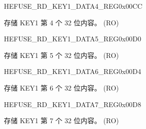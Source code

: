 \begin{register}{H}{EFUSE\_RD\_KEY1\_DATA4\_REG}{0x00CC}\label{regdesc:EFUSERDKEY1DATA4REG}
%
\regnewline%
\begin{regdesc}\begin{reglist}
\label{fielddesc:EFUSEKEY1DATA4}\item [EFUSE\_KEY1\_DATA4] 存储 KEY1 第 4 个 32 位内容。 (RO)
\end{reglist}\end{regdesc}
\end{register}


\begin{register}{H}{EFUSE\_RD\_KEY1\_DATA5\_REG}{0x00D0}\label{regdesc:EFUSERDKEY1DATA5REG}
%
\regnewline%
\begin{regdesc}\begin{reglist}
\label{fielddesc:EFUSEKEY1DATA5}\item [EFUSE\_KEY1\_DATA5] 存储 KEY1 第 5 个 32 位内容。 (RO)
\end{reglist}\end{regdesc}
\end{register}


\begin{register}{H}{EFUSE\_RD\_KEY1\_DATA6\_REG}{0x00D4}\label{regdesc:EFUSERDKEY1DATA6REG}
%
\regnewline%
\begin{regdesc}\begin{reglist}
\label{fielddesc:EFUSEKEY1DATA6}\item [EFUSE\_KEY1\_DATA6] 存储 KEY1 第 6 个 32 位内容。 (RO)
\end{reglist}\end{regdesc}
\end{register}


\begin{register}{H}{EFUSE\_RD\_KEY1\_DATA7\_REG}{0x00D8}\label{regdesc:EFUSERDKEY1DATA7REG}
%
\regnewline%
\begin{regdesc}\begin{reglist}
\label{fielddesc:EFUSEKEY1DATA7}\item [EFUSE\_KEY1\_DATA7] 存储 KEY1 第 7 个 32 位内容。 (RO)
\end{reglist}\end{regdesc}
\end{register}



